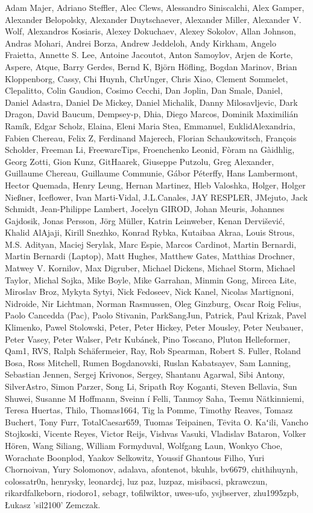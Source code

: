 Adam Majer, Adriano Steffler, Alec Clews, Alessandro Siniscalchi, Alex Gamper, Alexander Belopolsky, 
Alexander Duytschaever, Alexander Miller, Alexander V. Wolf, Alexandros Kosiaris, Alexey Dokuchaev, 
Alexey Sokolov, Allan Johnson, Andras Mohari, Andrei Borza, Andrew Jeddeloh, Andy Kirkham, Angelo Fraietta, 
Annette S. Lee, Antoine Jacoutot, Anton Samoylov, Arjen de Korte, Aspere, Atque, Barry Gerdes, Bernd K, 
Björn Höfling, Bogdan Marinov, Brian Kloppenborg, Cassy, Chi Huynh, ChrUnger, Chris Xiao, Clement Sommelet, 
Clepalitto, Colin Gaudion, Cosimo Cecchi, Dan Joplin, Dan Smale, Daniel, Daniel Adastra, Daniel De Mickey, 
Daniel Michalik, Danny Milosavljevic, Dark Dragon, David Baucum, Dempsey-p, Dhia, Diego Marcos, 
Dominik Maximilián Ramík, Edgar Scholz, Elaina, Eleni Maria Stea, Emmanuel, EuklidAlexandria, Fabien Chereau, 
Felix Z, Ferdinand Majerech, Florian Schaukowitsch, François Scholder, Freeman Li, FreewareTips, Froenchenko Leonid, 
Fòram na Gàidhlig, Georg Zotti, Gion Kunz, GitHaarek, Giuseppe Putzolu, Greg Alexander, Guillaume Chereau, 
Guillaume Communie, Gábor Péterffy, Hans Lambermont, Hector Quemada, Henry Leung, Hernan Martinez, Hleb Valoshka, 
Holger, Holger Nießner, Iceflower, Ivan Marti-Vidal, J.L.Canales, JAY RESPLER, JMejuto, Jack Schmidt, Jean-Philippe Lambert, 
Jocelyn GIROD, Johan Meuris, Johannes Gajdosik, Jonas Persson, Jörg Müller, Katrin Leinweber, Kenan Dervišević, 
Khalid AlAjaji, Kirill Snezhko, Konrad Rybka, Kutaibaa Akraa, Louis Strous, M.S. Adityan, Maciej Serylak, Marc Espie, 
Marcos Cardinot, Martin Bernardi, Martin Bernardi (Laptop), Matt Hughes, Matthew Gates, Matthias Drochner, 
Matwey V. Kornilov, Max Digruber, Michael Dickens, Michael Storm, Michael Taylor, Michal Sojka, Mike Boyle, 
Mike Garrahan, Minmin Gong, Mircea Lite, Miroslav Broz, Mykyta Sytyi, Nick Fedoseev, Nick Kanel, Nicolas Martignoni, 
Nidroide, Nir Lichtman, Norman Rasmussen, Oleg Ginzburg, Oscar Roig Felius, Paolo Cancedda (Pac), Paolo Stivanin, 
ParkSangJun, Patrick, Paul Krizak, Pavel Klimenko, Pawel Stolowski, Peter, Peter Hickey, Peter Mousley, Peter Neubauer, 
Peter Vasey, Peter Walser, Petr Kubánek, Pino Toscano, Pluton Helleformer, Qam1, RVS, Ralph Schäfermeier, Ray, Rob Spearman, 
Robert S. Fuller, Roland Bosa, Ross Mitchell, Rumen Bogdanovski, Ruslan Kabatsayev, Sam Lanning, Sebastian Jennen, 
Sergej Krivonos, Sergey, Shantanu Agarwal, Sibi Antony, SilverAstro, Simon Parzer, Song Li, Sripath Roy Koganti, 
Steven Bellavia, Sun Shuwei, Susanne M Hoffmann, Sveinn í Felli, Tanmoy Saha, Teemu Nätkinniemi, Teresa Huertas, Thilo, 
Thomas1664, Tig la Pomme, Timothy Reaves, Tomasz Buchert, Tony Furr, TotalCaesar659, Tuomas Teipainen, Tēvita O. Kaʻili, 
Vancho Stojkoski, Vicente Reyes, Victor Reijs, Vishvas Vasuki, Vladislav Bataron, Volker Hören, Wang Siliang, 
William Formyduval, Wolfgang Laun, Wonkyo Choe, Worachate Boonplod, Yaakov Selkowitz, Youssif Ghantous Filho, 
Yuri Chornoivan, Yury Solomonov, adalava, afontenot, bkuhls, bv6679, chithihuynh, colossatr0n, henrysky, leonardcj, 
luz paz, luzpaz, misibacsi, pkrawczun, rikardfalkeborn, riodoro1, sebagr, tofilwiktor, uwes-ufo, ysjbserver, 
zhu1995zpb, Łukasz 'sil2100' Zemczak.

